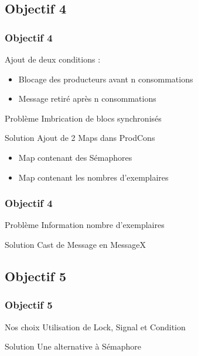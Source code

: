 \documentclass{beamer}
\begin{document}
    \subsection{Objectif 4}
    \begin{frame}
        \frametitle{Objectif 4}
        Ajout de deux conditions :
        \begin{itemize}
            \item Blocage des producteurs avant n consommations
            \item Message retiré après n consommations
        \end{itemize}

        \begin{alertblock}{Problème}
            Imbrication de blocs synchronisés
        \end{alertblock}

        \begin{exampleblock}{Solution}
            Ajout de 2 Maps dans ProdCons
            \begin{itemize}
                \item Map contenant des Sémaphores
                \item Map contenant les nombres d'exemplaires
            \end{itemize}
        \end{exampleblock}
    \end{frame}

    \begin{frame}
        \frametitle{Objectif 4}

        \begin{alertblock}{Problème}
            Information nombre d'exemplaires
        \end{alertblock}

        \begin{exampleblock}{Solution}
            Cast de Message en MessageX
        \end{exampleblock}
    \end{frame}

    \subsection{Objectif 5}
    \begin{frame}
        \frametitle{Objectif 5}
        \begin{block}{Nos choix}
            Utilisation de Lock, Signal et Condition
        \end{block}

        \begin{exampleblock}{Solution}
            Une alternative à Sémaphore
        \end{exampleblock}
    \end{frame}
\end{document}
